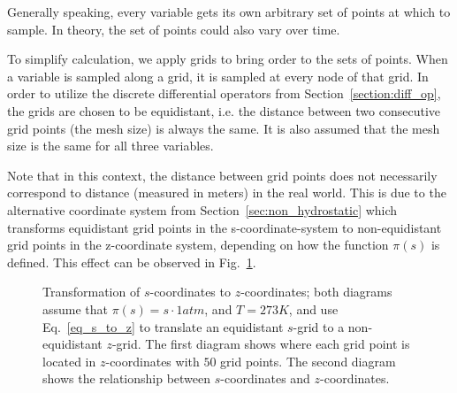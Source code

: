 Generally speaking, every variable gets its own arbitrary set of points at which to sample.
In theory, the set of points could also vary over time.

To simplify calculation, we apply grids to bring order to the sets of points.
When a variable is sampled along a grid, it is sampled at every node of that grid.
In order to utilize the discrete differential operators from Section~\ref{section:diff_op}, the grids are chosen to be equidistant, i.e. the distance between two consecutive grid points (the mesh size) is always the same.
It is also assumed that the mesh size is the same for all three variables.

Note that in this context, the distance between grid points does not necessarily correspond to distance (measured in meters) in the real world.
This is due to the alternative coordinate system from Section~\ref{sec:non_hydrostatic} which transforms equidistant grid points in the s-coordinate-system to non-equidistant grid points in the z-coordinate system, depending on how the function $\pi(s)$ is defined.
This effect can be observed in Fig.~\ref{fig:s_grid}.
\begin{figure}[ht]
    \caption{Transformation of $s$-coordinates to $z$-coordinates;
    both diagrams assume that $\pi (s)=s\cdot 1atm$, and $T=273K$, and use Eq.~\ref{eq_s_to_z} to translate an equidistant $s$-grid to a non-equidistant $z$-grid.
    The first diagram shows where each grid point is located in $z$-coordinates with $50$ grid points. 
    The second diagram shows the relationship between $s$-coordinates and $z$-coordinates.}
    \label{fig:s_grid}
\end{figure}

